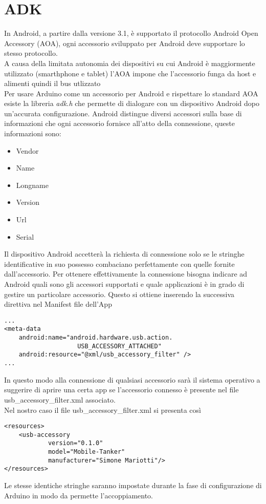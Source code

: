 \section {ADK}
In Android, a partire dalla versione 3.1, è supportato il protocollo Android Open 
Accessory (AOA), 
ogni accessorio sviluppato per Android deve supportare lo stesso protocollo. 
\\A causa della limitata autonomia dei dispositivi su cui Android è maggiormente 
utilizzato (smarthphone e tablet) l'AOA impone che l'accessorio funga da host 
e alimenti quindi il bus utlizzato
\\Per usare Arduino come un accessorio per Android e rispettare lo standard AOA 
esiste la libreria \textit{adk.h} che permette di dialogare con un dispositivo 
Android dopo un'accurata configurazione. Android distingue diversi accessori 
sulla base di informazioni che ogni accessorio fornisce all'atto della connessione, 
queste informazioni sono:
\begin{itemize}
\item Vendor
\item Name
\item Longname
\item Version
\item Url
\item Serial
\end{itemize} 
Il dispositivo Android accetterà la richiesta di connessione solo se le stringhe 
identificative in suo possesso combaciano perfettamente con quelle fornite 
dall'accessorio. Per ottenere effettivamente la connessione bisogna indicare ad 
Android quali sono gli accessori supportati e quale applicazioni è in grado di 
gestire un particolare accessorio. Questo si ottiene inserendo la successiva 
direttiva nel Manifest file dell'App

\lstset{language=XML}

\begin{lstlisting}[caption=Porzione del Manifest file dell'App]
...
<meta-data
    android:name="android.hardware.usb.action.
    				USB_ACCESSORY_ATTACHED"
    android:resource="@xml/usb_accessory_filter" />
...
\end{lstlisting}
In questo modo alla connessione di qualsiasi accessorio sarà il sistema operativo
a suggerire di aprire una certa app se l'accessorio connesso è presente nel file 
usb\_accessory\_filter.xml associato.
\\Nel nostro caso il file usb\_accessory\_filter.xml si presenta così
\begin{lstlisting}[caption=usb\_accessory\_filter.xml]
<resources>
    <usb-accessory
            version="0.1.0"
            model="Mobile-Tanker"
            manufacturer="Simone Mariotti"/>
</resources>
\end{lstlisting}
Le stesse identiche stringhe saranno impostate durante la fase di configurazione 
di Arduino in modo da permette l'accoppiamento.
